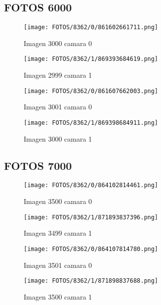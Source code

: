 \documentclass{article}
\begin{document}
\subsection{FOTOS 6000}

\begin{figure}[H]
  \centering
  \begin{minipage}[b]{0.45\textwidth}
    \centering
    \texttt{[image: FOTOS/8362/0/861602661711.png]}
    \caption{Imagen 3000 camara 0}
  \end{minipage}
  \begin{minipage}[b]{0.45\textwidth}
    \centering
    \texttt{[image: FOTOS/8362/1/869393684619.png]}
    \caption{Imagen 2999 camara 1}
  \end{minipage}
  \begin{minipage}[b]{0.45\textwidth}
    \centering
    \texttt{[image: FOTOS/8362/0/861607662003.png]}
    \caption{Imagen 3001 camara 0}
  \end{minipage}
  \begin{minipage}[b]{0.45\textwidth}
    \centering
    \texttt{[image: FOTOS/8362/1/869398684911.png]}
    \caption{Imagen 3000 camara 1}
  \end{minipage}
\end{figure}

\subsection{FOTOS 7000}

\begin{figure}[H]
  \centering
  \begin{minipage}[b]{0.45\textwidth}
    \centering
    \texttt{[image: FOTOS/8362/0/864102814461.png]}
    \caption{Imagen 3500 camara 0}
  \end{minipage}
  \begin{minipage}[b]{0.45\textwidth}
    \centering
    \texttt{[image: FOTOS/8362/1/871893837396.png]}
    \caption{Imagen 3499 camara 1}
  \end{minipage}
  \begin{minipage}[b]{0.45\textwidth}
    \centering
    \texttt{[image: FOTOS/8362/0/864107814780.png]}
    \caption{Imagen 3501 camara 0}
  \end{minipage}
  \begin{minipage}[b]{0.45\textwidth}
    \centering
    \texttt{[image: FOTOS/8362/1/871898837688.png]}
    \caption{Imagen 3500 camara 1}
  \end{minipage}
\end{figure}
\end{document}

